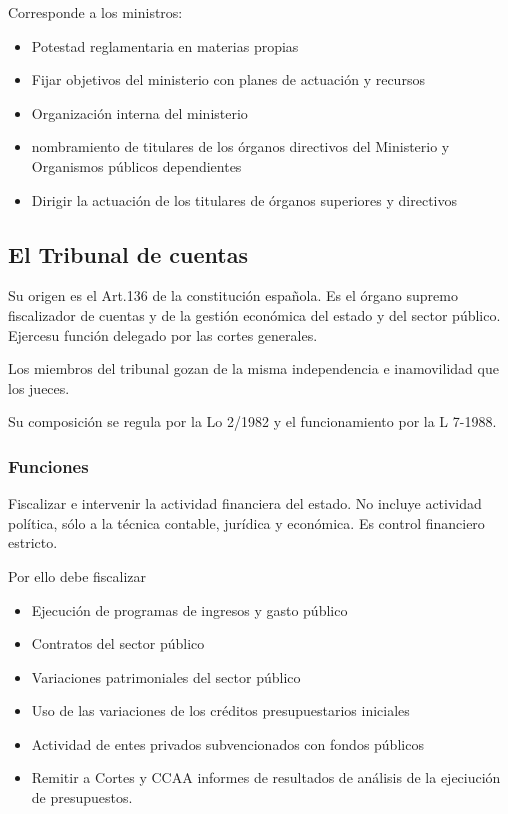         Corresponde a los ministros:
        \begin{itemize}
            \item Potestad reglamentaria en materias propias
            \item Fijar objetivos del ministerio con planes de actuación y recursos
            \item Organización interna del ministerio
            \item nombramiento de titulares de los órganos directivos del Ministerio y Organismos públicos dependientes
            \item Dirigir la actuación de los titulares de órganos superiores y directivos
        \end{itemize}

\subsection{El Tribunal de cuentas}
    Su origen es el Art.136 de la constitución española. Es el órgano supremo fiscalizador de cuentas y de la gestión económica del estado y del sector público. Ejercesu función delegado por las cortes generales.
    
    Los miembros del tribunal gozan de la misma independencia e inamovilidad que los jueces.

    Su composición se regula por la Lo 2/1982 y el funcionamiento por la L 7-1988.
    \subsubsection{Funciones}
        Fiscalizar e intervenir la actividad financiera del estado. No incluye actividad política, sólo a la técnica contable, jurídica y económica. Es control financiero estricto.

        Por ello debe fiscalizar
        \begin{itemize}
            \item Ejecución de programas de ingresos y gasto público
            \item Contratos del sector público
            \item Variaciones patrimoniales del sector público
            \item Uso de las variaciones de los créditos presupuestarios iniciales
            \item Actividad de entes privados subvencionados con fondos públicos
            \item Remitir a Cortes y CCAA informes de resultados de análisis de la ejeciución de presupuestos.
        \end{itemize}

